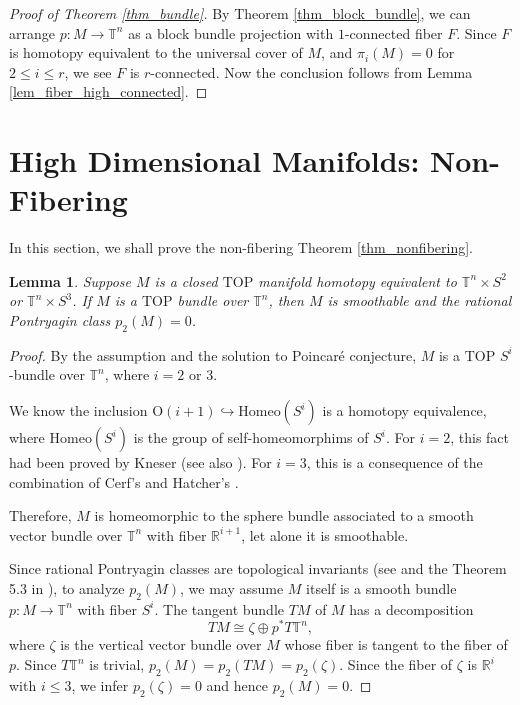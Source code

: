 \documentclass[12pt]{amsart}
\theoremstyle{plain}
\newtheorem{lemma}[theorem]{Lemma}
\theoremstyle{definition}
\theoremstyle{question}
\theoremstyle{remark}
\theoremstyle{assumption}
\numberwithin{equation}{section}
\theoremstyle{bigthm}
\begin{document}
\begin{proof}[Proof of Theorem \ref{thm_bundle}]
By Theorem \ref{thm_block_bundle}, we can arrange $p \colon  M \rightarrow \mathbb{T}^{n}$ as a block bundle projection with $1$-connected fiber $F$. Since $F$ is homotopy equivalent to the universal cover of $M$, and $\pi_{i} (M) =0$ for $2 \le i \le r$, we see $F$ is $r$-connected. Now the conclusion follows from Lemma \ref{lem_fiber_high_connected}.
\end{proof}

\section{High Dimensional Manifolds: Non-Fibering}\label{sec_nonfibering}
In this section, we shall prove the non-fibering Theorem \ref{thm_nonfibering}.

\begin{lemma}\label{lem_Tn_S2}
Suppose $M$ is a closed $\mathrm{TOP}$ manifold homotopy equivalent to $\mathbb{T}^{n} \times S^{2}$ or $\mathbb{T}^{n} \times S^{3}$. If $M$ is a $\mathrm{TOP}$ bundle over $\mathbb{T}^{n}$, then $M$ is smoothable and the rational Pontryagin class $p_{2} (M) =0$.
\end{lemma}
\begin{proof}
By the assumption and the solution to Poincar\'{e} conjecture, $M$ is a $\mathrm{TOP}$ $S^{i}$-bundle over $\mathbb{T}^{n}$, where $i=2$ or $3$.

We know the inclusion $\mathrm{O} (i+1) \hookrightarrow \mathrm{Homeo} (S^{i})$ is a homotopy equivalence, where $\mathrm{Homeo} (S^{i})$ is the group of self-homeomorphims of $S^{i}$. For $i=2$, this fact had been proved by Kneser \cite{Kneser} (see also \cite{Friberg}). For $i=3$, this is a consequence of the combination of Cerf's \cite[3.2.1]{Cerf61} and Hatcher's \cite{Hatcher83}.

Therefore, $M$ is homeomorphic to the sphere bundle associated to a smooth vector bundle over $\mathbb{T}^{n}$ with fiber $\mathbb{R}^{i+1}$, let alone it is smoothable.

Since rational Pontryagin classes are topological invariants (see \cite{Novikov} and the Theorem 5.3 in \cite[p.~317]{Kirby_Siebenmann}), to analyze $p_{2} (M)$, we may assume $M$ itself is a smooth bundle $p \colon  M \rightarrow \mathbb{T}^{n}$ with fiber $S^{i}$. The tangent bundle $TM$ of $M$ has a decomposition
\[
TM \cong \zeta \oplus p^{*} T \mathbb{T}^{n},
\]
where $\zeta$ is the vertical vector bundle over $M$ whose fiber is tangent to the fiber of $p$. Since $T \mathbb{T}^{n}$ is trivial, $p_{2} (M) = p_{2} (TM) = p_{2} (\zeta)$. Since the fiber of $\zeta$ is $\mathbb{R}^{i}$ with $i \le 3$, we infer $p_{2} (\zeta) =0$ and hence $p_{2} (M) = 0$.
\end{proof}
\end{document}
